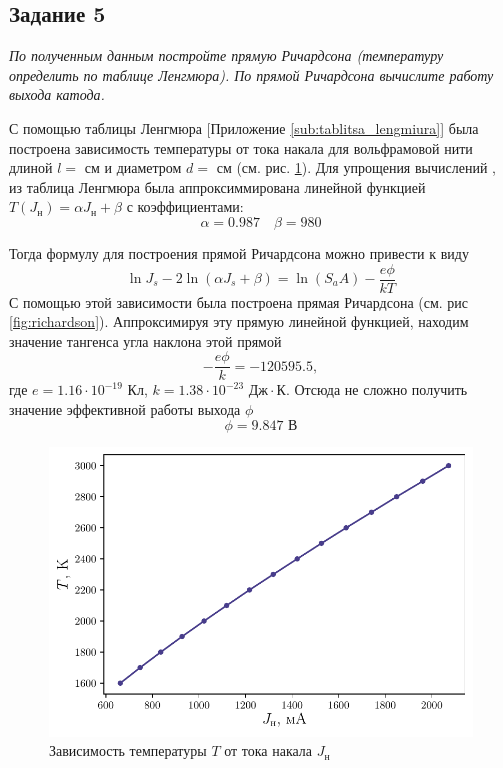 \subsection{Задание 5}
\textit{По полученным данным постройте прямую Ричардсона (температуру
    определить по таблице Ленгмюра). По прямой Ричардсона вычислите работу
выхода катода.}


С помощью таблицы Ленгмюра [Приложение \ref{sub:tablitsa_lengmiura}] была построена
зависимость температуры от тока накала для вольфрамовой нити длиной $l=$ см и
диаметром  $d = $ см (см. рис. \ref{fig:temperature}). Для упрощения вычислений 
, из таблица Ленгмюра была аппроксиммирована линейной функцией $T(J_{\text{н}})
= \alpha J_{\text{н}} + \beta$ с коэффициентами:
\begin{equation}
    \label{eq:approx_lengmur}
    \alpha = 0.987 \quad \beta = 980
\end{equation}

Тогда формулу для построения прямой Ричардсона можно привести к виду
\begin{equation}
    \label{eq:richardson}
    \ln J_s - 2 \ln(\alpha J_s + \beta )= \ln(S_a A) - \frac{e \phi}{k T}
\end{equation}
С помощью этой зависимости
была построена прямая Ричардсона (см. рис \ref{fig:richardson}). Аппроксимируя
эту прямую линейной функцией, находим значение тангенса угла наклона этой
прямой
\begin{equation}
    - \frac{e \phi}{k} = -120595.5,
\end{equation}
где $e= 1.16\cdot 10^{-19}$ Кл, $k = 1.38\cdot 10^{-23} \text{ Дж} \cdot
\text{К}.$
Отсюда не сложно получить значение эффективной работы выхода $\phi$
 \begin{equation}
     \phi = 9.847 \text{ В}
\end{equation}

\begin{figure}[H]
	\centering
    \includegraphics[width=0.75\linewidth]{scripts/lengmur}
	\caption{Зависимость температуры $T$ от тока накала $J_{\text{н}}$}
	\label{fig:temperature}
\end{figure}

